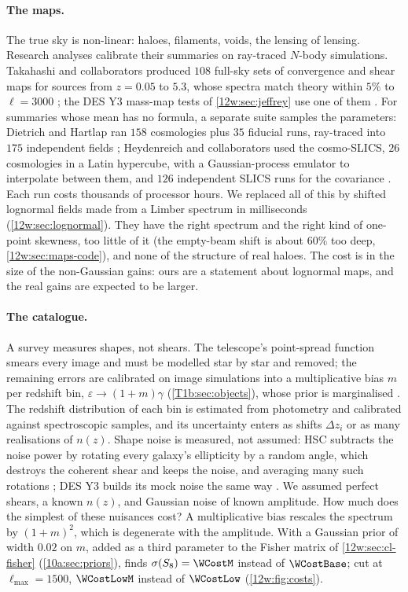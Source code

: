 \paragraph{The maps.} The true sky is non-linear: haloes, filaments, voids, the lensing of lensing. Research analyses
calibrate their summaries on ray-traced $N$-body simulations. Takahashi and collaborators produced $108$ full-sky sets
of convergence and shear maps for sources from $z=0.05$ to $5.3$, whose spectra match theory within $5\%$ to
$\ell=3000$ \cite{Takahashi2017sims}; the DES Y3 mass-map tests of \cref{12w:sec:jeffrey} use one of them
\cite{Jeffrey2021DESmass}. For summaries whose mean has no formula, a separate suite samples the parameters:
Dietrich and Hartlap ran $158$ cosmologies plus $35$ fiducial runs, ray-traced into $175$ independent fields
\cite{DietrichHartlap2010}; Heydenreich and collaborators used the cosmo-SLICS, $26$ cosmologies in a Latin
hypercube, with a Gaussian-process emulator to interpolate between them, and $126$ independent SLICS runs for the
covariance \cite{Heydenreich2021}. Each run costs thousands of processor hours. We replaced all of this by shifted
lognormal fields made from a Limber spectrum in milliseconds (\cref{12w:sec:lognormal}). They have the right spectrum
and the right kind of one-point skewness, too little of it (the empty-beam shift is about $60\%$ too deep,
\cref{12w:sec:maps-code}), and none of the structure of real haloes. The cost is in the size of the non-Gaussian
gains: ours are a statement about lognormal maps, and the real gains are expected to be larger.

\paragraph{The catalogue.} A survey measures shapes, not shears. The telescope's point-spread function smears every
image and must be modelled star by star and removed; the remaining errors are calibrated on image simulations into a
multiplicative bias $m$ per redshift bin, $\varepsilon\to(1+m)\gamma$ (\cref{T1b:sec:objects}), whose prior is
marginalised \cite{Asgari2021KiDS,Amon2022DES}. The redshift distribution of each bin is estimated from photometry and
calibrated against spectroscopic samples, and its uncertainty enters as shifts $\Delta z_i$ or as many realisations
of $n(z)$. Shape noise is measured, not assumed: HSC subtracts the noise power by rotating every galaxy's
ellipticity by a random angle, which destroys the coherent shear and keeps the noise, and averaging many such
rotations \cite{Hikage2019HSC}; DES Y3 builds its mock noise the same way \cite{Jeffrey2021DESmass}. We assumed
perfect shears, a known $n(z)$, and Gaussian noise of known amplitude. How much does the simplest of these nuisances
cost? A multiplicative bias rescales the spectrum by $(1+m)^2$, which is degenerate with the amplitude. With a
Gaussian prior of width $0.02$ on $m$, added as a third parameter to the Fisher matrix of \cref{12w:sec:cl-fisher}
(\cref{10a:sec:priors}),  finds $\sigma(S_8)=\WCostM$ instead of $\WCostBase$; cut at
$\ell_{\max}=1500$, $\WCostLowM$ instead of $\WCostLow$ (\cref{12w:fig:costs}).

